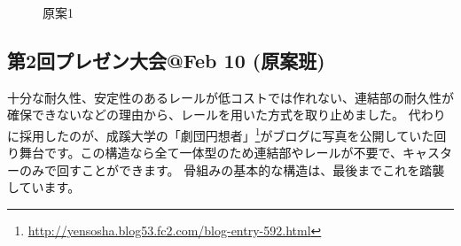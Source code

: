 \documentclass{jsarticle}
\begin{document}
\begin{figure}[htbp]
    \centering
    \caption{原案1}
    \label{figs:原案1}
\end{figure}

\clearpage

\subsection{第2回プレゼン大会@Feb 10 (原案班)}

十分な耐久性、安定性のあるレールが低コストでは作れない、連結部の耐久性が確保できないなどの理由から、レールを用いた方式を取り止めました。
代わりに採用したのが、成蹊大学の「劇団円想者」\footnote{\url{http://yensosha.blog53.fc2.com/blog-entry-592.html}}がブログに写真を公開していた回り舞台です。この構造なら全て一体型のため連結部やレールが不要で、キャスターのみで回すことができます。
骨組みの基本的な構造は、最後までこれを踏襲しています。
\end{document}
